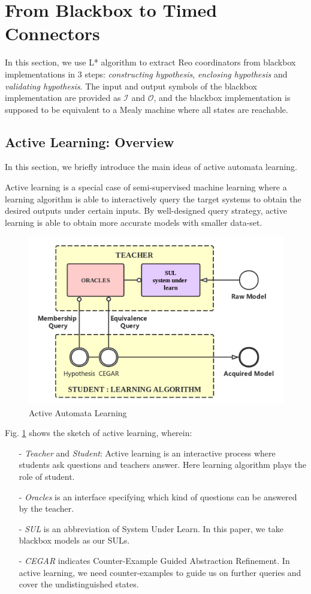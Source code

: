 \documentclass[conference, a4paper]{IEEEtran}
\begin{document}
\section{From Blackbox to Timed Connectors} 
\label{sec:activelearning}
In this section, we use L* algorithm to extract Reo coordinators from blackbox
implementations in 3 steps:
\emph{constructing hypothesis}, \emph{enclosing hypothesis} and \emph{validating hypothesis}. 
The input and output symbols of the blackbox implementation are provided as $\mathcal{I}$ and
$\mathcal{O}$, and the blackbox implementation is supposed to be equivalent to a Mealy machine where
all states are reachable.

\subsection{Active Learning: Overview}
In this section, we briefly introduce the main ideas of active automata learning.

Active learning \cite{settles2010active} is a special case of semi-supervised machine learning where
a learning algorithm is able to interactively query the target systems to obtain the desired outputs
under certain inputs. By well-designed query strategy, active learning is able to obtain more
accurate models with smaller data-set.

\begin{figure}[ht]
  \begin{center}
    \includegraphics[width=.5\textwidth]{./images/activelearning.png}
  \end{center}
  \caption{Active Automata Learning}
  \label{fig:activelearning}
\end{figure}

Fig. \ref{fig:activelearning} shows the sketch of active learning, wherein:
\begin{itemize}
  \item[-] \emph{Teacher} and \emph{Student}: Active learning is an interactive process where
    students ask questions and teachers answer. Here learning algorithm plays the role of student.
  \item[-] \emph{Oracles} is an interface specifying which kind of questions can be answered by the
    teacher.
  \item[-] \emph{SUL} is an abbreviation of System Under Learn. In this paper, we take blackbox
    models as our SULs.
  \item[-] \emph{CEGAR} indicates Counter-Example Guided Abstraction
    Refinement\cite{DBLP:conf/cav/ClarkeGJLV00}. In active learning, we need counter-examples to
    guide us on further queries and cover the undistinguished states.
\end{itemize}
\end{document}
